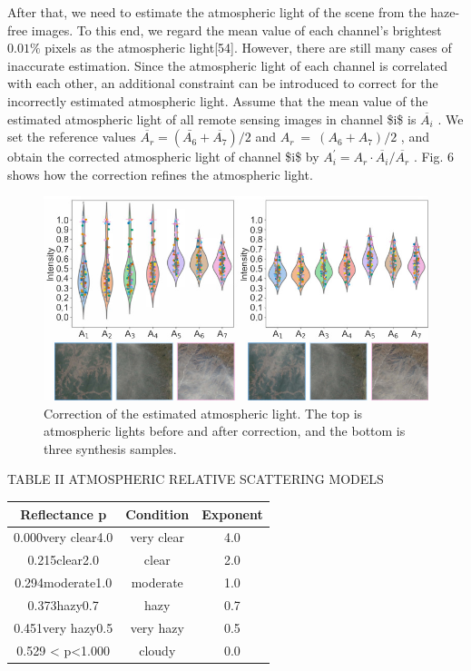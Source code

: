 After that, we need to estimate the atmospheric light of the scene from the haze-free images. To this end, we regard the mean value of each channel’s brightest $0.01\%$ pixels as the atmospheric light[54]. However, there are still many cases of inaccurate estimation. Since the atmospheric light of each channel is correlated with each other, an additional constraint can be introduced to correct for the incorrectly estimated atmospheric light. Assume that the mean value of the estimated atmospheric light of all remote sensing images in channel \$i\$ is $\overline{{A_{i}}}$ . We set the reference values $\overline{{A_{r}}}=(\bar{A_{6}}+\overline{{A_{7}}})/2$ and $A_{r}~=~(A_{6}+A_{7})/2$ , and obtain the corrected atmospheric light of channel \$i\$ by $A_{i}^{\prime}=A_{r}\cdot\overline{{A_{i}}}/\overline{{A_{r}}}$ . Fig. 6 shows how the correction refines the atmospheric light.

\begin{figure}[htbp]
\centering
\includegraphics[width=0.8\linewidth]{images/9863e249bd4948bf742b603693363cb6f8a3a0180771ab33330cabd744d2e0e5.jpg}
\caption{Correction of the estimated atmospheric light. The top is atmospheric lights before and after correction, and the bottom is three synthesis samples.}
\label{fig:6}
\end{figure}


TABLE II ATMOSPHERIC RELATIVE SCATTERING MODELS


\begin{table}[htbp]
\centering
\begin{tabular}{|c|c|c|}\hline
Reflectance p & Condition & Exponent \\ \hline
0.000very clear4.0 & very clear & 4.0 \\ \hline
0.215clear2.0 & clear & 2.0 \\ \hline
0.294moderate1.0 & moderate & 1.0 \\ \hline
0.373hazy0.7 & hazy & 0.7 \\ \hline
0.451very hazy0.5 & very hazy & 0.5 \\ \hline
0.529 < p<1.000 & cloudy & 0.0 \\ \hline
\end{tabular}\end{table}

